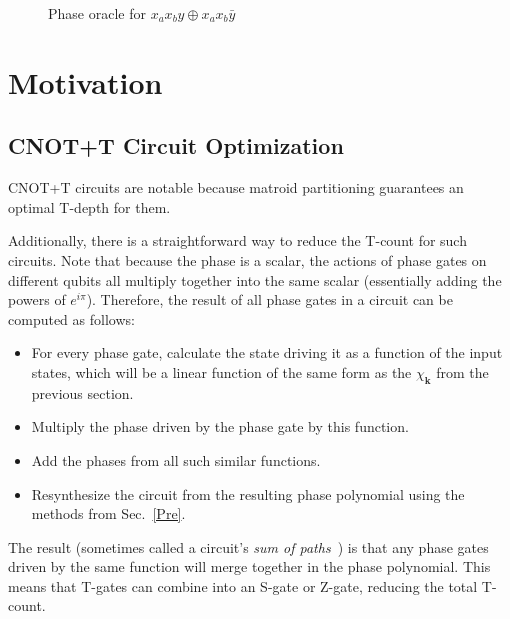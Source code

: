 \begin{figure*}[t]
  \centering
  \begin{minipage}{\textwidth}
    \centering
    \scalebox{0.9} {
      
    }
    \scalebox{0.9} {
      
    }
  \end{minipage}
  \caption{Phase oracle for $x_a x_b y \oplus x_a x_b \bar{y}$}
  \label{fig-series-all}
\end{figure*}

\section{Motivation}
\label{Mot}
\subsection{CNOT+T Circuit Optimization}
\label{Mot:CnotOpt}
CNOT+T circuits are notable because matroid partitioning guarantees an optimal T-depth
for them.

Additionally, there is a straightforward way to reduce the T-count for such circuits.
Note that because the phase is a scalar, the actions of phase gates on different
qubits all multiply together into the same scalar (essentially adding the powers
of $e^{i \pi}$). Therefore, the result of all phase gates in a circuit
can be computed as follows:

\begin{itemize}
\item For every phase gate, calculate the state driving it as a function of the
  input states, which will be a linear function of the same form as the
  $\chi_{\mathbf{k}}$ from the previous section.
\item Multiply the phase driven by the phase gate by this function.
\item Add the phases from all such similar functions.
\item Resynthesize the circuit from the resulting phase polynomial using
  the methods from Sec.~\ref{Pre}.
\end{itemize}

The result (sometimes called a circuit's {\it sum of paths}~\cite{bib-amy-cnot})
is that any phase gates driven by the same function will merge
together in the phase polynomial. This means that T-gates
can combine into an S-gate or Z-gate, reducing the total T-count.

